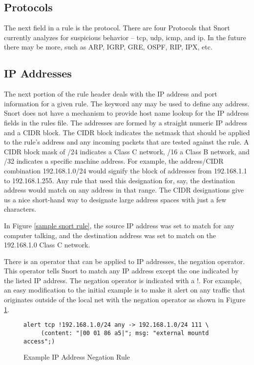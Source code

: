 \documentclass[english]{report}
\begin{document}
\subsection{Protocols}

The next field in a rule is the protocol. There are four Protocols
that Snort currently analyzes for suspicious behavior -- tcp, udp,
icmp, and ip. In the future there may be more, such as ARP, IGRP,
GRE, OSPF, RIP, IPX, etc.


\subsection{IP Addresses}

The next portion of the rule header deals with the IP address and
port information for a given rule. The keyword any
may be used to define any address. Snort does not have a mechanism
to provide host name lookup for the IP address fields in the rules
file. The addresses are formed by a straight numeric IP address and
a CIDR\cite{CIDRnotation} block. The CIDR block indicates the netmask
that should be applied to the rule's address and any incoming packets
that are tested against the rule. A CIDR block mask of /24 indicates
a Class C network, /16 a Class B network, and /32 indicates a specific
machine address. For example, the address/CIDR combination 192.168.1.0/24
would signify the block of addresses from 192.168.1.1 to 192.168.1.255.
Any rule that used this designation for, say, the destination address
would match on any address in that range. The CIDR designations give
us a nice short-hand way to designate large address spaces with just
a few characters.

In Figure \ref{sample snort rule}, the source IP address was set
to match for any computer talking, and the destination address was
set to match on the 192.168.1.0 Class C network.

There is an operator that can be applied to IP addresses, the negation
operator. This operator tells Snort to match any IP address except
the one indicated by the listed IP address. The negation operator
is indicated with a !. For example, an easy modification
to the initial example is to make it alert on any traffic that originates
outside of the local net with the negation operator as shown in Figure
\ref{Example Negation}.

\begin{center}
\begin{figure}[!hbpt]
\begin{verbatim}
alert tcp !192.168.1.0/24 any -> 192.168.1.0/24 111 \
     (content: "|00 01 86 a5|"; msg: "external mountd access";)
\end{verbatim}

\caption{\label{Example Negation} Example IP Address Negation Rule}
\end{figure}
\end{center}
\end{document}
